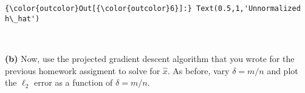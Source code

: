 \documentclass[11pt]{article}
\begin{document}
\begin{Verbatim}[commandchars=\\\{\}]
{\color{outcolor}Out[{\color{outcolor}6}]:} Text(0.5,1,'Unnormalized h\_hat')
\end{Verbatim}
            
    \begin{center}
    \end{center}
    { \hspace*{\fill} \\}
    
    \textbf{(b)} Now, use the projected gradient descent algorithm that you
wrote for the previous homework assigment to solve for \(\hat{x}\). As
before, vary \(\delta = m/n\) and plot the \(\ell_2\) error as a
function of \(\delta = m/n\).
\end{document}
